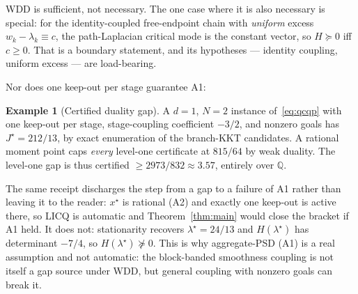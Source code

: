 \documentclass[11pt]{article}
\theoremstyle{definition}
\newtheorem{example}{Example}
\theoremstyle{remark}
\newcommand{\Q}{\mathbb{Q}}
\renewcommand{\_}{\ifdim\fontdimen3\font=0pt\relax\char`\_\else\textunderscore\fi\hspace{0pt}}
\begin{document}
WDD is sufficient, not necessary. The one case where it is also necessary is
special: for the identity-coupled free-endpoint chain with \emph{uniform}
excess $w_k-\lambda_k\equiv c$, the path-Laplacian critical mode is the
constant vector, so $H\succeq0$ iff $c\ge0$. That is a boundary statement,
and its hypotheses --- identity coupling, uniform excess --- are
load-bearing.

Nor does one keep-out per stage guarantee A1:
\begin{example}[Certified duality gap]\label{ex:gap}
A $d{=}1$, $N{=}2$ instance of~\eqref{eq:qcqp} with one
keep-out per stage, stage-coupling coefficient $-3/2$, and nonzero goals has
$J^\star=212/13$, by exact enumeration of the branch-KKT candidates. A
rational moment point caps \emph{every} level-one certificate at $815/64$ by
weak duality. The level-one gap is thus certified $\ge2973/832\approx3.57$,
entirely over $\Q$.
\end{example}
\noindent The same receipt discharges the step from a gap to a failure of A1
rather than leaving it to the reader: $x^\star$ is rational (A2) and exactly
one keep-out is active there, so LICQ is automatic and Theorem~\ref{thm:main}
would close the bracket if A1 held. It does not: stationarity recovers
$\lambda^\star=24/13$ and $H(\lambda^\star)$ has determinant $-7/4$, so
$H(\lambda^\star)\not\succeq0$. This is why aggregate-PSD (A1) is a real
assumption and not automatic: the block-banded smoothness coupling is not
itself a gap source under WDD, but general coupling with nonzero goals can
break it.
\end{document}
